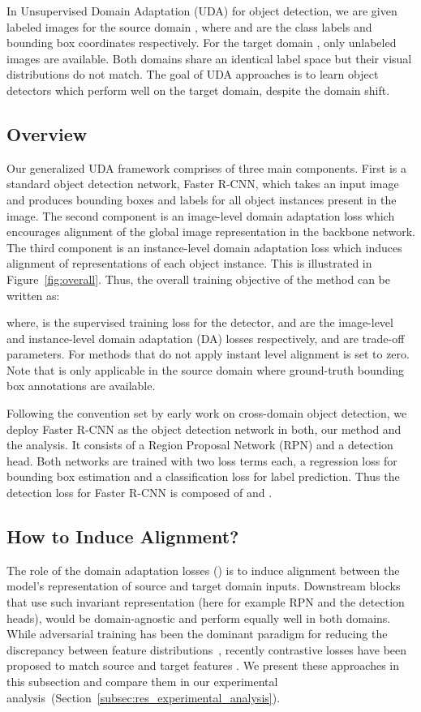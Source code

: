 \documentclass[10pt,twocolumn,letterpaper]{article}
\DeclareRobustCommand{\figref}[1]{Figure~\ref{#1}}
\DeclareRobustCommand{\secref}[1]{Section~\ref{#1}}
\begin{document}
 In Unsupervised Domain Adaptation (UDA) for object detection, we are given  labeled images for the source domain , where  and  are the class labels and bounding box coordinates respectively. For the target domain , only  unlabeled images are available.
Both domains share an identical label space but their visual distributions do not match. The goal of UDA approaches is to learn object detectors which perform well on the target domain, despite the domain shift.
\subsection{Overview} 
Our  generalized UDA framework comprises  of three main components.
First is a standard object detection network, Faster R-CNN, which takes an input image and produces bounding boxes and labels for all object instances present in the image. 
The second component is an image-level domain adaptation loss which encourages alignment of the global image representation in the backbone network.
The third component is an instance-level domain adaptation loss which induces alignment of representations of each object instance. 
This is illustrated in \figref{fig:overall}. 
Thus, the overall training objective of the method can be written as:

where,  is the supervised training loss for the detector,  and  are the image-level and instance-level domain adaptation (DA) losses respectively,  and  are trade-off parameters. For methods that do not apply instant level alignment  is set to zero. Note that  is only applicable in the source domain where ground-truth bounding box annotations are available. 

 Following the convention set by early work on cross-domain object detection, we deploy Faster R-CNN \cite{da_faster_rcnn} as the object detection network in both, our method and the analysis. 
It consists of a Region Proposal Network (RPN) and a detection head. Both networks are trained with two loss terms each, a regression loss for bounding box estimation and a classification loss for label prediction. Thus the detection loss  for Faster R-CNN is composed of  and . 
\subsection{How to Induce Alignment?}
\label{subsec:alignment_mechanism}
The role of the domain adaptation losses () is to induce alignment between the model's representation of source and target domain inputs. 
Downstream blocks that use such invariant representation (here for example RPN and the detection heads), 
would be domain-agnostic and perform equally well in both domains.
While adversarial training has been the dominant paradigm for reducing the discrepancy between feature distributions~\cite{da_faster_rcnn, strong-weak, zhu_cvpr19_selective_alignment}, recently contrastive losses have been proposed to match source and target features \cite{GPA, kang2019contrastive}. We present these approaches in this subsection and compare them in our experimental analysis~(\secref{subsec:res_experimental_analysis}).
\end{document}
